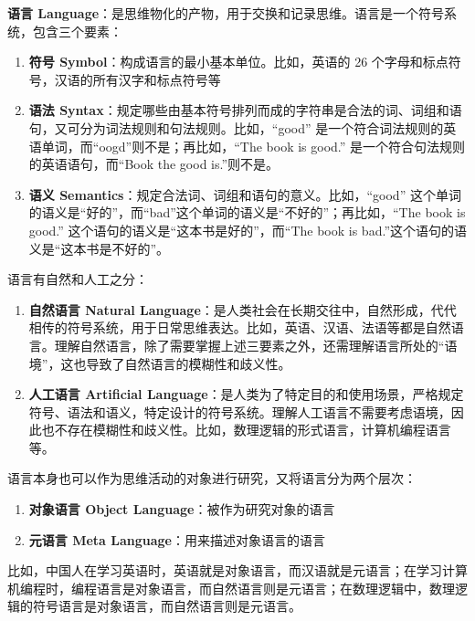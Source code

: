 \vspace{1em}
\textbf{语言 Language}：是思维物化的产物，用于交换和记录思维。语言是一个符号系统，包含三个要素：
\begin{enumerate}
    \item \textbf{符号 Symbol}：构成语言的最小基本单位。比如，英语的 26 个字母和标点符号，汉语的所有汉字和标点符号等
    \item \textbf{语法 Syntax}：规定哪些由基本符号排列而成的字符串是合法的词、词组和语句，又可分为词法规则和句法规则。比如，“good” 是一个符合词法规则的英语单词，而“oogd”则不是；再比如，“The book is good.” 是一个符合句法规则的英语语句，而“Book the good is.”则不是。
    \item \textbf{语义 Semantics}：规定合法词、词组和语句的意义。比如，“good” 这个单词的语义是“好的”，而“bad”这个单词的语义是“不好的”；再比如，“The book is good.” 这个语句的语义是“这本书是好的”，而“The book is bad.”这个语句的语义是“这本书是不好的”。
\end{enumerate}
语言有自然和人工之分：
\begin{enumerate}
    \item \textbf{自然语言 Natural Language}：是人类社会在长期交往中，自然形成，代代相传的符号系统，用于日常思维表达。比如，英语、汉语、法语等都是自然语言。理解自然语言，除了需要掌握上述三要素之外，还需理解语言所处的“语境”，这也导致了自然语言的模糊性和歧义性。
    \item \textbf{人工语言 Artificial Language}：是人类为了特定目的和使用场景，严格规定符号、语法和语义，特定设计的符号系统。理解人工语言不需要考虑语境，因此也不存在模糊性和歧义性。比如，数理逻辑的形式语言，计算机编程语言等。
\end{enumerate}
语言本身也可以作为思维活动的对象进行研究，又将语言分为两个层次：
\begin{enumerate}
    \item \textbf{对象语言 Object Language}：被作为研究对象的语言
    \item \textbf{元语言 Meta Language}：用来描述对象语言的语言
\end{enumerate}
比如，中国人在学习英语时，英语就是对象语言，而汉语就是元语言；在学习计算机编程时，编程语言是对象语言，而自然语言则是元语言；在数理逻辑中，数理逻辑的符号语言是对象语言，而自然语言则是元语言。
